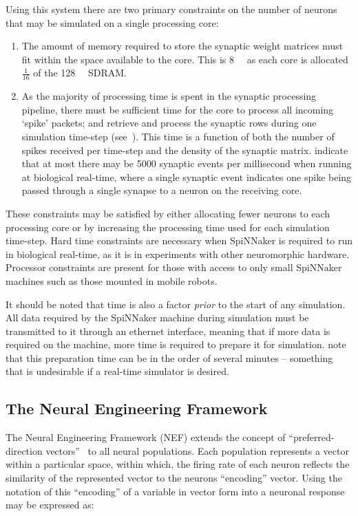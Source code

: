 \documentclass[conference]{IEEEtran}
\begin{document}
Using this system there are two primary constraints on the number of neurons that may be simulated on a single processing core:

  \begin{enumerate}
    \item The amount of memory required to store the synaptic weight matrices must fit within the space available to the core.
      This is \SI{8}{\mebi\byte} as each core is allocated $\frac{1}{16}$ of the \SI{128}{\mebi\byte} SDRAM.
    \item As the majority of processing time is spent in the synaptic processing pipeline, there must be sufficient time for the core to process all incoming `spike' packets; and retrieve and process the synaptic rows during one simulation time-step (see~\parencite{Sharp2013}).
This time is a function of both the number of spikes received per time-step and the density of the synaptic matrix.
\textcite[\S III.C]{Sharp2013} indicate that at most there may be \num{5000} synaptic events per millisecond when running at biological real-time, where a single synaptic event indicates one spike being passed through a single synapse to a neuron on the receiving core.
  \end{enumerate}

These constraints may be satisfied by either allocating fewer neurons to each processing core or by increasing the processing time used for each simulation time-step.
Hard time constraints are necessary when SpiNNaker is required to run in biological real-time, as it is in experiments with other neuromorphic hardware.
Processor constraints are present for those with access to only small SpiNNaker machines such as those mounted in mobile robots.

It should be noted that time is also a factor \textit{prior} to the start of any simulation.
All data required by the SpiNNaker machine during simulation must be transmitted to it through an ethernet interface, meaning that if more data is required on the machine, more time is required to prepare it for simulation.
\textcite{Sharp2013} note that this preparation time can be in the order of several minutes  -- something that is undesirable if a real-time simulator is desired.

  \subsection{The Neural Engineering Framework}
  \label{sec:background/nef}

The Neural Engineering Framework (NEF) extends the concept of ``preferred-direction vectors''~\parencite{Georgopoulos1986} to all neural populations.
Each population represents a vector within a particular space, within which, the firing rate of each neuron reflects the similarity of the represented vector to the neurons ``encoding'' vector.
Using the notation of \textcite{Stewart2014} this ``encoding'' of a variable in vector form into a neuronal response may be expressed as:
\end{document}
